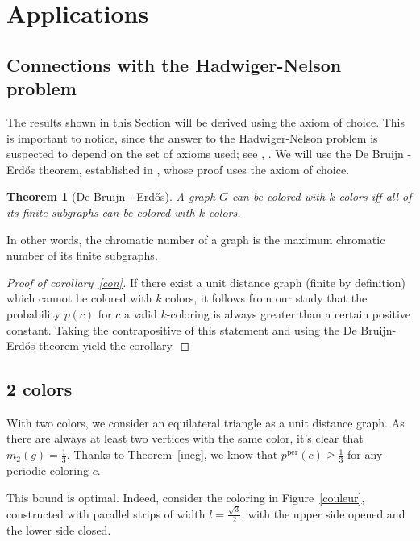 \documentclass[a4paper,11pt]{article}
\newtheorem{theo}{Theorem}
\theoremstyle{definition}
\theoremstyle{remark}
\newcommand{\pper}{p^{\mathrm{per}}}
\begin{document}
\section{Applications} \label{appli}
\subsection{Connections with the Hadwiger-Nelson problem} \label{hn}
The results shown in this Section will be derived using the axiom of choice. 
This is important to notice, since the answer to the Hadwiger-Nelson problem is 
suspected to depend on the set of axioms used; see \cite{choice}, \cite{choice2}. We will use the 
De Bruijn - Erd\H{o}s theorem, established in \cite{erdos}, whose proof uses 
the axiom of choice.
\begin{theo}[De Bruijn - Erd\H{o}s]
 A graph $G$ can be colored with $k$ colors iff all of its finite subgraphs 
 can be colored with $k$ colors.
\end{theo}
In other words, the chromatic number of a graph is the maximum chromatic number 
of its finite subgraphs.

\begin{proof}[Proof of corollary~\ref{con}]If there exist a unit distance graph (finite by definition) which cannot 
be colored with $k$ colors, it 
follows from our study that the probability $p(c)$ for $c$ a valid 
$k$-coloring is always greater than a certain positive constant. Taking the 
contrapositive of this statement and using the De Bruijn-Erd\H{o}s theorem yield 
the corollary.
\end{proof}

\subsection{2 colors} \label{2col}

With two colors, we consider an equilateral triangle as a unit distance graph. 
As there are always at least two vertices with the same color, it's clear that 
$m_2(g) = \frac{1}{3}$. Thanks to Theorem~\ref{ineg}, 
we know that $\pper(c) \geq \frac13$ for any periodic coloring $c$.

This bound is optimal. Indeed, consider the coloring in Figure~\ref{couleur}, 
constructed with parallel strips of width 
$l = \frac {\sqrt3}{2}$, with the upper side opened and the lower side closed. 
\end{document}
